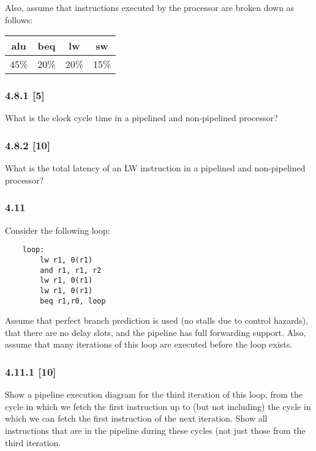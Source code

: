 \documentclass[fleqn]{article}
\begin{document}
Also, assume that instructions executed by the processor are broken down as follows:
\begin{table}[H]
    \centering
    \begin{tabular}{|c|c|c|c|}
    \hline
    \rowcolor[HTML]{1391DB} 
    alu & beq & lw & sw  \\ \hline \hline
    45\% & 20\% & 20\% & 15\% \\ \hline
    \end{tabular}
\end{table}
\subsubsection*{4.8.1 [5] \textrangle} What is the clock cycle time in a pipelined and non-pipelined processor?

\subsubsection*{4.8.2 [10] \textrangle} What is the total latency of an LW instruction in a pipelined and non-pipelined processor?
\vspace{0.125in}

\subsubsection*{4.11} Consider the following loop:
\begin{lstlisting}
    loop:
        lw r1, 0(r1)
        and r1, r1, r2
        lw r1, 0(r1)
        lw r1, 0(r1)
        beq r1,r0, loop
\end{lstlisting}
Assume that perfect branch prediction is used (no stalls due to control hazards), that there are no delay slots,
and the pipeline has full forwarding support. Also, assume that many iterations of this loop are executed
before the loop exists.

\subsubsection*{4.11.1 [10] \textrangle} Show a pipeline execution diagram for the third iteration of this loop, from the cycle in which we
fetch the first instruction up to (but not including) the cycle in which we can fetch the first instruction of
the next iteration. Show all instructions that are in the pipeline during these cycles (not just those from the
third iteration.
\vspace{0.125in}
\end{document}
